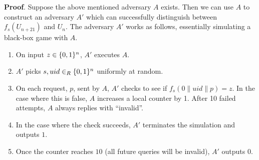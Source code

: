 \documentclass{article}
\begin{document}
\begin{enumerate}[,label=\alph*.]
\begin{mdbmarginx}{1ex}{0pt}{1ex}{0pt}%
\noindent{}\textbf{Proof}.  Suppose the above mentioned adversary $A$ exists. Then we can use $A$ to construct an adversary $A'$
which can successfully distinguish between $f_s(U_{n+21})$ and $U_{n}$. The adversary $A'$ works
as follows, essentially simulating a black-box game with $A$.%

\begin{enumerate}[noitemsep,topsep=\mdcompacttopsep]%

\item{}On input $z \in \{0,1\}^n$, $A'$ executes $A$.%

\item{}$A'$ picks $s,uid \in_R \{0,1\}^n$ uniformly at random.%

\item{}On each request, $p$, sent by $A$, $A'$ checks to see if $f_s(0 \| uid \| p) = z$. In 
the case where this is false, $A$ increases a local counter by 1. After 10 failed attempts,
$A$ always replies with \textquotedblleft{}invalid\textquotedblright{}.%

\item{}In the case where the check succeeds, $A'$ terminates the simulation and outputs $1$.%

\item{}Once the counter reaches $10$ (all future queries will be invalid), $A'$ outputs $0$.%
\end{enumerate}%


\end{mdbmarginx}
\end{enumerate}
\end{document}
